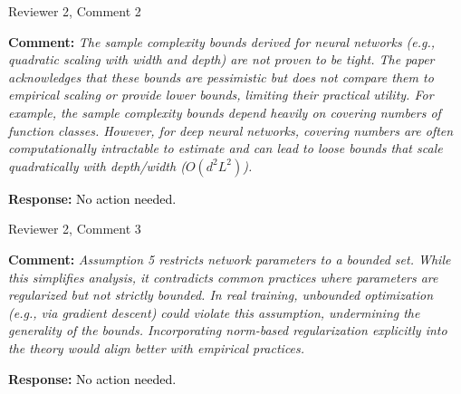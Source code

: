 \documentclass[11pt]{article}
\newcommand{\ReviewerText}[1]{%
    \begin{tcolorbox}[
        enhanced, frame hidden, colback=revbg,
        left=5pt, right=5pt, top=5pt, bottom=5pt, arc=2pt
    ]
        \textbf{\textcolor{revtitle}{Comment:}} 
        \itshape \textcolor{black!80}{#1}
    \end{tcolorbox}
    \vspace{0.05cm}
}
\newcommand{\AuthorResponse}[1]{%
    \begin{tcolorbox}[
        enhanced, frame hidden, colback=authbg,
        left=5pt, right=5pt, top=5pt, bottom=5pt, arc=2pt
    ]
        \textbf{\textcolor{authtitle}{Response:}} 
        \normalfont \textcolor{black}{#1}
    \end{tcolorbox}
    \vspace{0.1cm}
}
\newcommand{\AutoRevision}[1]{%
    \begin{tcolorbox}[
        enhanced, breakable,
        colback=revisionbg, frame hidden,
        borderline west={3pt}{0pt}{blue!40}, %
        left=5pt, right=5pt, top=5pt, bottom=5pt,
        arc=2pt 
    ]
        \textbf{\textcolor{blue!40!black}{Revisions in Manuscript:}}
        
        \renewcommand{\do}[1]{%
            \par\vspace{0.3cm} %
            
            {\small\bfseries\color{blue!60!black} $\hookrightarrow$ Section \ref{rev:##1}, Page \pageref{rev:##1}:}
            
            \par\nopagebreak
            \begingroup
            \itshape\small \Paste{text:##1}
            \endgroup
        }
        \docsvlist{#1} %
    \end{tcolorbox}
}
\begin{document}
\begin{ReviewCycle}{Reviewer 2, Comment 2}
    \ReviewerText{
        The sample complexity bounds derived for neural networks (e.g., quadratic scaling with width and depth) are not proven to be tight. The paper acknowledges that these bounds are pessimistic but does not compare them to empirical scaling or provide lower bounds, limiting their practical utility. For example, the sample complexity bounds depend heavily on covering numbers of function classes. However, for deep neural networks, covering numbers are often computationally intractable to estimate and can lead to loose bounds that scale quadratically with depth/width ($O(d^2 L^2)$).
    }
    \AuthorResponse{No action needed.}
\end{ReviewCycle}

\begin{ReviewCycle}{Reviewer 2, Comment 3}
    \ReviewerText{
        Assumption 5 restricts network parameters to a bounded set. While this simplifies analysis, it contradicts common practices where parameters are regularized but not strictly bounded. In real training, unbounded optimization (e.g., via gradient descent) could violate this assumption, undermining the generality of the bounds. Incorporating norm-based regularization explicitly into the theory would align better with empirical practices.
    }
    \AuthorResponse{No action needed.}

\end{ReviewCycle}
\end{document}

